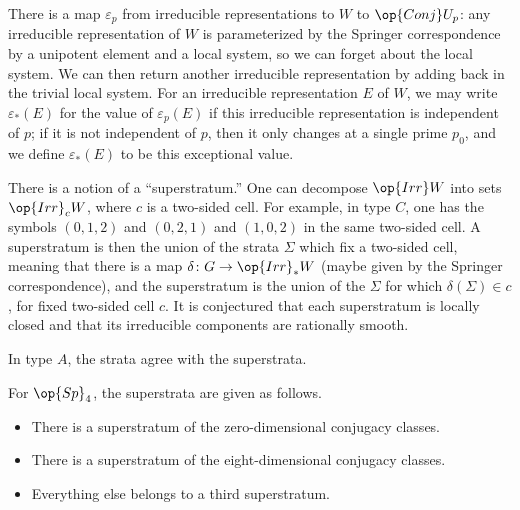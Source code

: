 \documentclass[../notes.tex]{subfiles}
\begin{document}
\begin{remark}
	There is a map $\varepsilon_p$ from irreducible representations to $W$ to $\op{Conj}U_p$: any irreducible representation of $W$ is parameterized by the Springer correspondence by a unipotent element and a local system, so we can forget about the local system. We can then return another irreducible representation by adding back in the trivial local system. For an irreducible representation $E$ of $W$, we may write $\varepsilon_*(E)$ for the value of $\varepsilon_p(E)$ if this irreducible representation is independent of $p$; if it is not independent of $p$, then it only changes at a single prime $p_0$, and we define $\varepsilon_*(E)$ to be this exceptional value.
\end{remark}
\begin{remark}
	There is a notion of a ``superstratum.'' One can decompose $\op{Irr}W$ into sets $\op{Irr}_cW$, where $c$ is a two-sided cell. For example, in type $C$, one has the symbols $(0,1,2)$ and $(0,2,1)$ and $(1,0,2)$ in the same two-sided cell. A superstratum is then the union of the strata $\Sigma$ which fix a two-sided cell, meaning that there is a map $\delta\colon G\to\op{Irr}_*W$ (maybe given by the Springer correspondence), and the superstratum is the union of the $\Sigma$ for which $\delta(\Sigma)\in c$, for fixed two-sided cell $c$. It is conjectured that each superstratum is locally closed and that its irreducible components are rationally smooth.
\end{remark}
\begin{example}
	In type $A$, the strata agree with the superstrata.
\end{example}
\begin{example}
	For $\op{Sp}_4$, the superstrata are given as follows.
	\begin{itemize}
		\item There is a superstratum of the zero-dimensional conjugacy classes.
		\item There is a superstratum of the eight-dimensional conjugacy classes.
		\item Everything else belongs to a third superstratum.
	\end{itemize}
\end{example}
\end{document}
